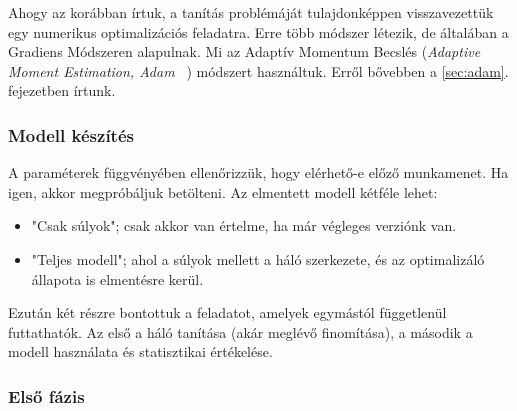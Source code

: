 
Ahogy az korábban írtuk, a tanítás problémáját tulajdonképpen visszavezettük egy numerikus optimalizációs feladatra. Erre több módszer létezik, de általában a Gradiens Módszeren alapulnak. Mi az Adaptív Momentum Becslés (\textit{Adaptive Moment Estimation, Adam~\cite{kingma2014adam} }) módszert használtuk. Erről bővebben a \ref{sec:adam}. fejezetben írtunk.
%
%
%
%
%
%
%
%
%


\subsubsection{Modell készítés}

A paraméterek függvényében ellenőrizzük, hogy elérhető-e előző munkamenet.
Ha igen, akkor megpróbáljuk betölteni. Az elmentett modell kétféle lehet:

\begin{samepage}
	\begin{itemize}
		\item 
		"Csak súlyok"; csak akkor van értelme, ha már végleges verziónk van.
		
		\item 	
		"Teljes modell"; ahol a súlyok mellett a háló szerkezete, és az optimalizáló állapota
		is elmentésre kerül.
	\end{itemize}
\end{samepage}





Ezután két részre bontottuk a feladatot, amelyek egymástól függetlenül futtathatók.
Az első a háló tanítása (akár meglévő finomítása), a második a modell használata 
és statisztikai értékelése.

\subsubsection{Első fázis}

